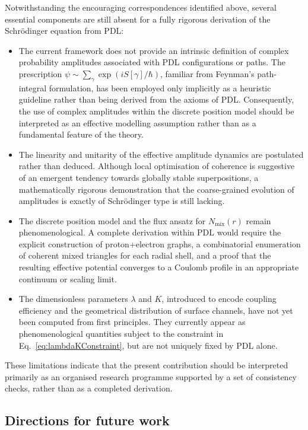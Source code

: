 \documentclass[11pt,a4paper]{article}
\begin{document}
Notwithstanding the encouraging correspondences identified above, several essential components are still absent for a fully rigorous derivation of the Schr\"odinger equation from PDL:
\begin{itemize}
\item The current framework does not provide an intrinsic definition of complex probability amplitudes associated with PDL configurations or paths. The prescription $\psi \sim \sum_{\gamma} \exp(iS[\gamma]/\hbar)$, familiar from Feynman’s path-integral formulation, has been employed only implicitly as a heuristic guideline rather than being derived from the axioms of PDL. Consequently, the use of complex amplitudes within the discrete position model should be interpreted as an effective modelling assumption rather than as a fundamental feature of the theory.\item The linearity and unitarity of the effective amplitude dynamics are postulated rather than deduced. Although local optimisation of coherence is suggestive of an emergent tendency towards globally stable superpositions, a mathematically rigorous demonstration that the coarse-grained evolution of amplitudes is exactly of Schr\"odinger type is still lacking.
\item The discrete position model and the flux ansatz for $N_{\mathrm{mix}}(r)$ remain phenomenological. A complete derivation within PDL would require the explicit construction of proton+electron graphs, a combinatorial enumeration of coherent mixed triangles for each radial shell, and a proof that the resulting effective potential converges to a Coulomb profile in an appropriate continuum or scaling limit.
\item The dimensionless parameters $\lambda$ and $K$, introduced to encode coupling efficiency and the geometrical distribution of surface channels, have not yet been computed from first principles. They currently appear as phenomenological quantities subject to the constraint in Eq.~\eqref{eq:lambdaKConstraint}, but are not uniquely fixed by PDL alone.
\end{itemize}
These limitations indicate that the present contribution should be interpreted primarily as an organised research programme supported by a set of consistency checks, rather than as a completed derivation.

\subsection{Directions for future work}
\end{document}
